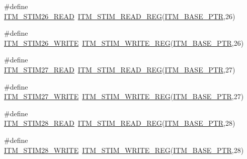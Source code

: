 \begin{DoxyCompactItemize}
\item 
\#define \hyperlink{group___i_t_m___register___accessor___macros_ga8c35b9a8ec5da55c3822fd3960b46ffd}{I\+T\+M\+\_\+\+S\+T\+I\+M26\+\_\+\+R\+E\+AD}~\hyperlink{group___i_t_m___register___accessor___macros_ga5009882336aadcd4f37b45cf3395c450}{I\+T\+M\+\_\+\+S\+T\+I\+M\+\_\+\+R\+E\+A\+D\+\_\+\+R\+EG}(\hyperlink{group___i_t_m___peripheral_gafaddee8fe8b6a898d4e5edc43ee0d703}{I\+T\+M\+\_\+\+B\+A\+S\+E\+\_\+\+P\+TR},26)
\item 
\#define \hyperlink{group___i_t_m___register___accessor___macros_ga56f074bfff0348baad454e7fba80c007}{I\+T\+M\+\_\+\+S\+T\+I\+M26\+\_\+\+W\+R\+I\+TE}~\hyperlink{group___i_t_m___register___accessor___macros_ga049ca92a4e78e77c19af81e51aa73f1c}{I\+T\+M\+\_\+\+S\+T\+I\+M\+\_\+\+W\+R\+I\+T\+E\+\_\+\+R\+EG}(\hyperlink{group___i_t_m___peripheral_gafaddee8fe8b6a898d4e5edc43ee0d703}{I\+T\+M\+\_\+\+B\+A\+S\+E\+\_\+\+P\+TR},26)
\item 
\#define \hyperlink{group___i_t_m___register___accessor___macros_gad396bfbe5ecd26d08ddcdeb9102e28d2}{I\+T\+M\+\_\+\+S\+T\+I\+M27\+\_\+\+R\+E\+AD}~\hyperlink{group___i_t_m___register___accessor___macros_ga5009882336aadcd4f37b45cf3395c450}{I\+T\+M\+\_\+\+S\+T\+I\+M\+\_\+\+R\+E\+A\+D\+\_\+\+R\+EG}(\hyperlink{group___i_t_m___peripheral_gafaddee8fe8b6a898d4e5edc43ee0d703}{I\+T\+M\+\_\+\+B\+A\+S\+E\+\_\+\+P\+TR},27)
\item 
\#define \hyperlink{group___i_t_m___register___accessor___macros_gae1575242a2ddb0a6d0089f2f49072265}{I\+T\+M\+\_\+\+S\+T\+I\+M27\+\_\+\+W\+R\+I\+TE}~\hyperlink{group___i_t_m___register___accessor___macros_ga049ca92a4e78e77c19af81e51aa73f1c}{I\+T\+M\+\_\+\+S\+T\+I\+M\+\_\+\+W\+R\+I\+T\+E\+\_\+\+R\+EG}(\hyperlink{group___i_t_m___peripheral_gafaddee8fe8b6a898d4e5edc43ee0d703}{I\+T\+M\+\_\+\+B\+A\+S\+E\+\_\+\+P\+TR},27)
\item 
\#define \hyperlink{group___i_t_m___register___accessor___macros_gaeedb9934131b7f1d727aab5f0282751f}{I\+T\+M\+\_\+\+S\+T\+I\+M28\+\_\+\+R\+E\+AD}~\hyperlink{group___i_t_m___register___accessor___macros_ga5009882336aadcd4f37b45cf3395c450}{I\+T\+M\+\_\+\+S\+T\+I\+M\+\_\+\+R\+E\+A\+D\+\_\+\+R\+EG}(\hyperlink{group___i_t_m___peripheral_gafaddee8fe8b6a898d4e5edc43ee0d703}{I\+T\+M\+\_\+\+B\+A\+S\+E\+\_\+\+P\+TR},28)
\item 
\#define \hyperlink{group___i_t_m___register___accessor___macros_gadf3581234ae31f01dc8bbc5fe2d5fa06}{I\+T\+M\+\_\+\+S\+T\+I\+M28\+\_\+\+W\+R\+I\+TE}~\hyperlink{group___i_t_m___register___accessor___macros_ga049ca92a4e78e77c19af81e51aa73f1c}{I\+T\+M\+\_\+\+S\+T\+I\+M\+\_\+\+W\+R\+I\+T\+E\+\_\+\+R\+EG}(\hyperlink{group___i_t_m___peripheral_gafaddee8fe8b6a898d4e5edc43ee0d703}{I\+T\+M\+\_\+\+B\+A\+S\+E\+\_\+\+P\+TR},28)

\end{DoxyCompactItemize}
